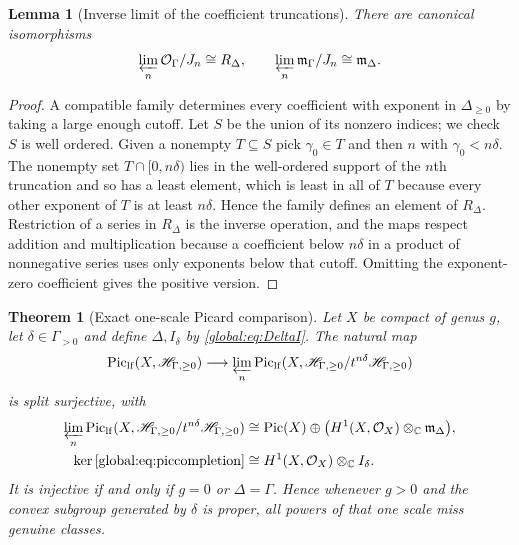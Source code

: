 \documentclass[11pt,letterpaper]{article}
\newtheorem{theorem}{Theorem}[section]
\newtheorem{lemma}[lemma]{Lemma}
\theoremstyle{definition}
\theoremstyle{remark}
\newcommand{\C}{\mathbb C}
\newcommand{\OO}{\mathcal O}
\newcommand{\HI}{\mathscr H_{\Gamma,\ge0}}
\newcommand{\mK}{\mathfrak m_\Gamma}
\newcommand{\Pic}{\operatorname{Pic}}
\newcommand{\Piclf}{\operatorname{Pic}_{\mathrm{lf}}}
\numberwithin{equation}{section}
\begin{document}
\begin{lemma}[Inverse limit of the coefficient truncations]\label{global:lem:coefficientlimit}
There are canonical isomorphisms
\begin{equation}\label{global:eq:coefficientlimit}
  \varprojlim_n\OO_\Gamma/J_n\cong R_\Delta,
  \qquad
  \varprojlim_n\mK/J_n\cong\mathfrak m_\Delta .
\end{equation}
\end{lemma}

\begin{proof}
A compatible family determines every coefficient with exponent in $\Delta_{\ge0}$ by taking a large enough cutoff. Let $S$ be the union of its nonzero indices; we check $S$ is well ordered. Given a nonempty $T\subseteq S$ pick $\gamma_0\in T$ and then $n$ with $\gamma_0<n\delta$. The nonempty set $T\cap[0,n\delta)$ lies in the well-ordered support of the $n$th truncation and so has a least element, which is least in all of $T$ because every other exponent of $T$ is at least $n\delta$. Hence the family defines an element of $R_\Delta$. Restriction of a series in $R_\Delta$ is the inverse operation, and the maps respect addition and multiplication because a coefficient below $n\delta$ in a product of nonnegative series uses only exponents below that cutoff. Omitting the exponent-zero coefficient gives the positive version.
\end{proof}

\begin{theorem}[Exact one-scale Picard comparison]\label{global:thm:adic}
Let $X$ be compact of genus $g$, let $\delta\in\Gamma_{>0}$ and define $\Delta,I_\delta$ by \eqref{global:eq:DeltaI}. The natural map
\begin{equation}\label{global:eq:piccompletion}
  \Piclf(X,\HI)\longrightarrow\varprojlim_n\Piclf(X,\HI/t^{n\delta}\HI)
\end{equation}
is \emph{split surjective}, with
\begin{align}
  \varprojlim_n\Piclf(X,\HI/t^{n\delta}\HI)
  &\cong\Pic(X)\oplus\bigl(H^1(X,\OO_X)\otimes_\C\mathfrak m_\Delta\bigr),
  \label{global:eq:piclimtarget}\\
  \ker\eqref{global:eq:piccompletion}
  &\cong H^1(X,\OO_X)\otimes_\C I_\delta .
  \label{global:eq:piclimkernel}
\end{align}
It is injective if and only if $g=0$ or $\Delta=\Gamma$. Hence whenever $g>0$ and the convex subgroup generated by $\delta$ is proper, all powers of that one scale miss genuine classes.
\end{theorem}
\end{document}
